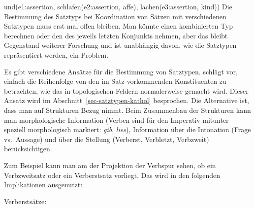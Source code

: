 \ea
und(e1:assertion, schlafen(e2:assertion, affe), lachen(e3:assertion, kind))
\z
Die Bestimmung des Satztyps bei Koordination von Sätzen mit verschiedenen Satztypen muss erst mal
offen bleiben. Man könnte einen kombinierten Typ berechnen oder den des jeweils letzten Konjunkts
nehmen, aber das bleibt Gegenstand weiterer Forschung und ist unabhängig davon, wie die Satztypen
repräsentiert werden, ein Problem.

Es gibt verschiedene Ansätze für die Bestimmung von Satztypen. \citet{Kathol2000a,Kathol2001a}
schlägt vor, einfach die Reihenfolge von den im Satz vorkommenden Konstituenten zu betrachten, wie
das in topologischen Feldern normalerweise gemacht wird. Dieser Ansatz wird im
Abschnitt~\ref{sec-satztypen-kathol} besprochen. Die Alternative ist, dass man auf Strukturen Bezug
nimmt. Beim Zusammenbau der Strukturen kann man morphologische Information (Verben sind für den
Imperativ mitunter speziell morphologisch markiert: \emph{gib}, \emph{lies}), Information über die
Intonation (Frage vs.\ Aussage) und über die Stellung (Verberst, Verbletzt, Verbzweit) berücksichtigen.

Zum Beispiel kann man am \slashw der Projektion der Verbspur sehen, ob ein Verbzweitsatz oder ein
Verberstsatz vorliegt. Das wird in den folgenden Implikationen ausgenutzt:

\eas
Verberstsätze:\\
 \impl\\
\hfill{}
\zs

